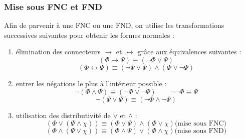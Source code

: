 \subsubsection{Mise sous FNC et FND}\label{sec:mettreFNCFND}
Afin de parvenir à une FNC ou une FND, on utilise les transformations successives suivantes pour obtenir les formes normales :
\begin{enumerate}
    \item élimination des connecteurs $\rightarrow$ et $\leftrightarrow$ grâce aux équivalences suivantes :
    \begin{equation*}
        (\Phi\rightarrow\Psi)\equiv(\neg\Phi\vee\Psi)
    \end{equation*}
    \begin{equation*}
        (\Phi\leftrightarrow\Psi)\equiv(\neg\Psi\vee\Psi)\wedge(\Phi\vee\neg\Psi)
    \end{equation*}
    \item entrer les négations le plus à l'intérieur possible :
    \begin{equation*}
        \neg(\Phi\wedge\Psi)\equiv(\neg\Phi\vee\neg\Psi) \qquad \neg\neg\Phi \equiv \Psi
    \end{equation*}
    \begin{equation*}
        \neg(\Psi\vee\Psi)\equiv(\neg\Phi\wedge\neg\Psi)
    \end{equation*}
    \item utilisation des distributivité de $\vee$ et $\wedge$ :
    \begin{equation*}
        (\Phi\vee(\Psi\wedge\chi )) \equiv (\Phi\vee\Psi)\wedge(\Phi\vee\chi)\text{(mise sous FNC)}
    \end{equation*}
    \begin{equation*}
        (\Phi\wedge(\Psi\vee\chi)) \equiv (\Phi\wedge\Psi)\vee(\Phi\wedge\chi)\text{(mise sous FND)}
    \end{equation*}
\end{enumerate}
